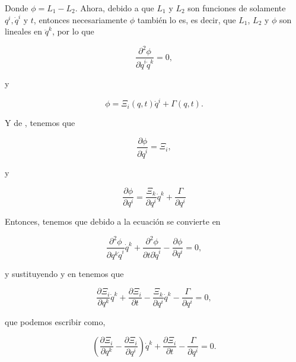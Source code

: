 \documentclass[a4paper,10pt]{article}
\numberwithin{equation}{section}
\begin{document}
Donde $\phi = L_1 - L_2$. Ahora, debido a que $L_1$ y $L_2$ son funciones de solamente 
$q^i,\dot{q}^i$ y $t$, entonces necesariamente $\phi$ también lo es, es decir, que 
$L_1$, $L_2$ y $\phi$ son lineales en $\ddot{q}^k$, por lo que

\begin{equation}
 \frac{\partial^2 \phi}{\partial \dot{q}^i\dot{q}^k} = 0,
 \label{eq:4phi0}
\end{equation}

y 

\begin{equation}
 \phi = \Xi_i (q,t) \dot{q}^i + \Gamma(q,t).
 \label{eq:4phi1}
\end{equation}

Y de , tenemos que 

\begin{equation}
 \frac{\partial \phi}{\partial \dot{q}^i} = \Xi_i,
 \label{eq:4xi1}
\end{equation}

y

\begin{equation}
 \frac{\partial \phi}{\partial q^i} = \frac{\Xi_k}{\partial q^i}\dot{q}^k + \frac{\Gamma}{\partial q^i}
\label{eq:4phipartial}
 \end{equation}


Entonces, tenemos que debido a  la ecuación  se convierte en

\begin{equation}
 \frac{\partial^2 \phi}{\partial q^k \dot{q}^i} \dot{q}^k + \frac{\partial^2 \phi}{\partial t \partial \dot{q}^i}  
 - \frac{\partial \phi}{\partial q^i} = 0,
 \label{eq:4cero1}
\end{equation}

y sustituyendo  y  en  tenemos que

\begin{equation}
 \frac{\partial \Xi_i}{\partial q^k} \dot{q}^k + \frac{\partial \Xi_i}{\partial t}
- \frac{\Xi_k}{\partial q^i}\dot{q}^k - \frac{\Gamma}{\partial q^i} = 0,
\end{equation}

que podemos escribir como,

\begin{equation}
 \left( \frac{\partial \Xi_i}{\partial q^k} - \frac{\partial \Xi_i}{\partial q^i}\right) \dot{q}^k
 + \frac{\partial \Xi_i}{\partial t} - \frac{\Gamma}{\partial q^i} = 0.
\end{equation}
\end{document}
